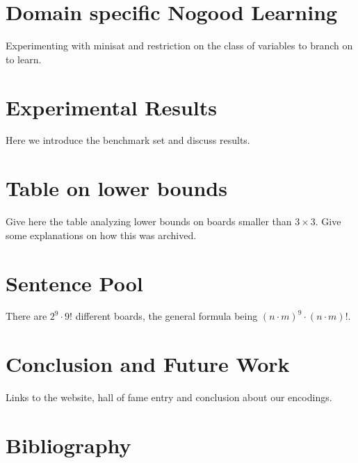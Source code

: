 \documentclass[]{llncs}
\begin{document}
\section{Domain specific Nogood Learning}

Experimenting with minisat and restriction on the class of variables to branch on to learn.

\section{Experimental Results}

Here we introduce the benchmark set and discuss results. 

\section{Table on lower bounds}

Give here the table analyzing lower bounds on boards smaller than $3\times 3$. Give some explanations on how this was
archived. 

\section{Sentence Pool}

There are $2^9 \cdot 9!$ different boards, the general formula being $(n\cdot m)^9 \cdot (n\cdot m)!$.

\section{Conclusion and Future Work}

Links to the website, hall of fame entry and conclusion about our encodings. 

\section{Bibliography}



\end{document}

